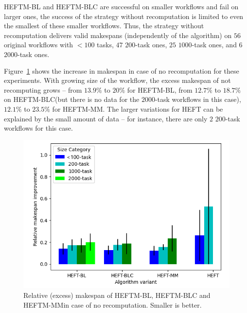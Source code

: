 \documentclass[conference]{IEEEtran}
\newcommand{\algo}[1]{\textsc{#1}}
\newcommand{\heft}{\algo{HEFT}\xspace}
\newcommand{\heftmm}{\algo{HEFTM-MM}\xspace}
\newcommand{\heftbl}{\algo{HEFTM-BL}\xspace}
\newcommand{\heftblc}{\algo{HEFTM-BLC}\xspace}
\newcommand{\new}[1]{{\color{blue}#1}}
\begin{document}
\heftbl and \heftblc are successful on smaller workflows and fail on larger ones, 
the success of the strategy without recomputation is limited to even the smallest of these smaller workflows.
Thus, the strategy without recomputation delivers valid makespans (independently of the algorithm) 
on $56$ original workflows with $<100$ tasks, $47$ $200$-task ones, $25$ $1000$-task ones, and $6$ $2000$-task ones.

Figure~\ref{fig:updates-ms} shows the increase in makespan in case of no recomputation for these experiments.
With growing size of the workflow, the excess makespan of not recomputing grows -- from $13.9\%$ to $20\%$ for \heftbl,
from $12.7\%$ to $18.7\%$ on \heftblc (but there is no data for the $2000$-task workflows in this case),
$12.1\%$ to $23.5\%$ for \heftmm.
The larger variations for \heft can be explained by the small amount of data -- for instance, there are
only $2$ $200$-task workflows for this case.

\begin{figure}[tb]
    \centering
    \includegraphics[width=0.95\columnwidth] {images/UpdatesMss2}
    \caption{Relative (excess) makespan of \heftbl, \heftblc and \heftmm \new{in case of no recomputation}. Smaller is better.}
    \label{fig:updates-ms}
    \vspace{-0.3cm}
\end{figure}
\end{document}
